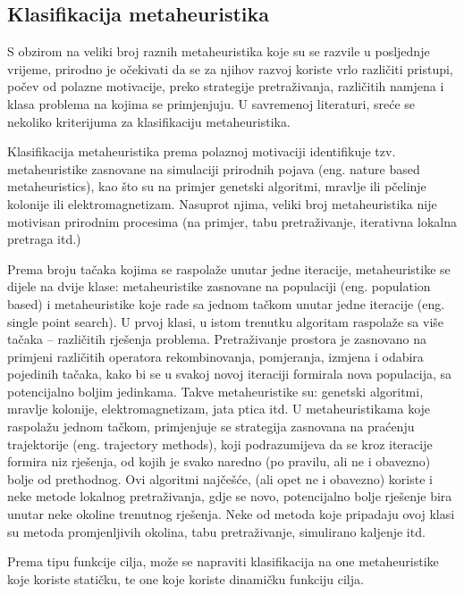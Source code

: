 \documentclass[a4paper, utf8, 11pt, colorlinks]{book}
\begin{document}
 \subsection{Klasifikacija metaheuristika}
 S obzirom na veliki broj raznih metaheuristika koje su se razvile u posljednje vrijeme, prirodno je očekivati da se za  njihov razvoj koriste vrlo različiti pristupi, počev od polazne motivacije, preko strategije pretraživanja, različitih namjena i klasa problema na kojima se primjenjuju.
 U savremenoj literaturi, sreće se nekoliko kriterijuma za klasifikaciju metaheuristika.
 
 Klasifikacija metaheuristika prema polaznoj motivaciji identifikuje tzv. metaheuristike zasnovane na simulaciji prirodnih pojava (eng. nature based metaheuristics), kao što su na primjer genetski algoritmi, mravlje ili pčelinje kolonije ili elektromagnetizam. Nasuprot njima, veliki broj metaheuristika nije motivisan prirodnim procesima (na primjer, tabu pretraživanje, iterativna lokalna pretraga itd.)
 
 Prema broju tačaka kojima se raspolaže unutar jedne iteracije, metaheuristike se dijele na dvije klase: metaheuristike zasnovane na populaciji (eng. population based) i metaheuristike koje rade sa jednom tačkom unutar jedne iteracije (eng. single point search). U prvoj klasi, u istom trenutku algoritam raspolaže sa više tačaka -- različitih rješenja problema. Pretraživanje prostora je zasnovano na primjeni različitih operatora rekombinovanja, pomjeranja, izmjena i odabira pojedinih tačaka, kako bi se u svakoj novoj iteraciji formirala nova populacija, sa potencijalno boljim jedinkama. Takve metaheuristike su: genetski algoritmi, mravlje kolonije, elektromagnetizam, jata ptica itd.
 U metaheuristikama koje raspolažu jednom tačkom, primjenjuje se strategija zasnovana na praćenju trajektorije (eng. trajectory methods), koji podrazumijeva da se kroz iteracije formira niz rješenja, od kojih je svako naredno (po pravilu, ali ne i obavezno) bolje od prethodnog. Ovi algoritmi najčešće, (ali opet ne i obavezno) koriste i neke metode lokalnog pretraživanja, gdje se novo, potencijalno bolje rješenje bira unutar neke okoline trenutnog rješenja. Neke od metoda koje pripadaju ovoj klasi su metoda promjenljivih okolina, tabu pretraživanje, simulirano kaljenje itd.
 
 Prema tipu funkcije cilja, može se napraviti klasifikacija na one metaheuristike koje koriste statičku, te one koje koriste dinamičku funkciju cilja.
 
\end{document}
